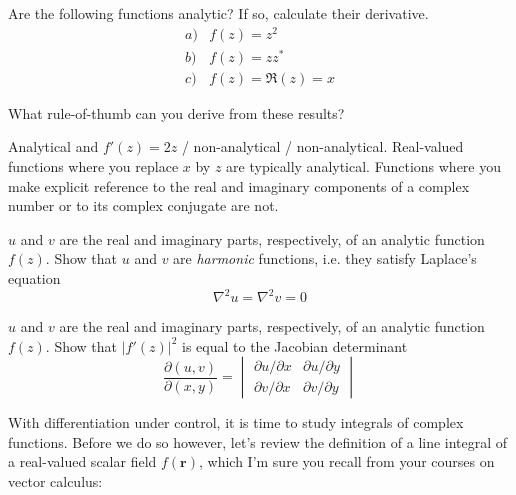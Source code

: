 \begin{exer}
Are the following functions analytic? If so, calculate their derivative.
$$\begin{array}{lcll}a) & f(z)=z^2 \\b) & f(z)=z z^* \\c) & f(z)= \Re(z)=x \end{array}$$

What rule-of-thumb can you derive from these results?

\begin{sol}
Analytical and $f'(z)=2z$ / non-analytical / non-analytical. Real-valued functions where you replace $x$ by $z$ are typically analytical. Functions where you make explicit reference to the real and imaginary components of a complex number or to its complex conjugate are not.
\end{sol}
  
\end{exer}

\begin{exer}
\label{ex-harmonic}
$u$ and $v$ are the real and imaginary parts, respectively, of an analytic function $f(z)$. Show that $u$ and $v$ are \emph{harmonic} functions, i.e. they satisfy Laplace's equation
$$\nabla^2 u = \nabla^2 v = 0$$
\end{exer}

\begin{exer}
$u$ and $v$ are the real and imaginary parts, respectively, of an analytic function $f(z)$. Show that $|f'(z)|^2$ is equal to the Jacobian determinant
$$\frac{\partial (u,v)}{\partial (x,y)} =  \begin{vmatrix} \partial u / \partial x & \partial u / \partial y \\ \partial v / \partial x & \partial v / \partial y \end{vmatrix}$$
\end{exer}


\pagebreak



With differentiation under control, it is time to study integrals of complex functions. Before we do so however, let's review the definition of a line integral of a real-valued scalar field $f(\mathbf{r})$, which I'm sure you recall from your courses on vector calculus:

